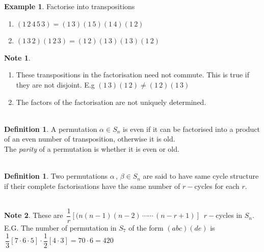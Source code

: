 \documentclass[11pt,a4paper]{article}
\theoremstyle{definition}
\newtheorem{defn}[thm]{Definition}
\newtheorem{exa}[thm]{Example}
\newtheorem*{note}{Note}
\begin{document}
\begin{exa}
Factorise into transpositions
\end{exa}
\begin{enumerate}
\item[(a)] $(1\,2\,4\,5\,3) = (1\,3)(1\,5)(1\,4)(1\,2)$
\item[(b)] $(1\,3\,2)(1\,2\,3) = (1\,2)(1\,3)(1\,3)(1\,2)$\\
\end{enumerate}

\begin{note}
\begin{enumerate}
\item[•] These transpositions in the factorisation need not commute. This is true if they are not disjoint. E.g $(1\,3)(1\,2)\neq (1\,2)(1\,3)$
\item[•] The factors of the factorisation are not uniquely determined.\\\\
\end{enumerate}
\end{note}







\begin{defn}
A permutation $\alpha \in S_n$ is even if it can be factorised into a product of an even number of transposition, otherwise it is old.\\


The \textit{parity} of a permutation is whether it is even or old.\\\\
\end{defn}





\begin{defn}
Two permutations $\alpha\,,\, \beta\in S_n$ are said to have same cycle structure if their complete factorisations have the same number of $r-$cycles for each $r$.\\\\
\end{defn}


\begin{note}
These are $\, \dfrac{1}{r}[(n(n-1)(n-2)\, \cdots\cdots\, (n-r+1)]\,$ $r-$cycles in $S_n$. E.G. The number of permutation in $S_7$ of the form $(abc)(de)$ is $\, \dfrac{1}{3}[7\cdot 6\cdot 5]\cdot\dfrac{1}{2}[4\cdot 3] = 70\cdot 6 = 420$\\\\
\end{note}
\end{document}
